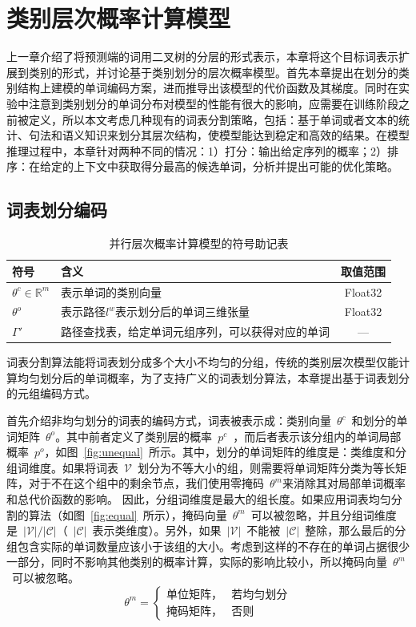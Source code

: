 \chapter{类别层次概率计算模型}
上一章介绍了将预测端的词用二叉树的分层的形式表示，本章将这个目标词表示扩展到类别的形式，并讨论基于类别划分的层次概率模型。首先本章提出在划分的类别结构上建模的单词编码方案，进而推导出该模型的代价函数及其梯度。同时在实验中注意到类别划分的单词分布对模型的性能有很大的影响，应需要在训练阶段之前被定义，所以本文考虑几种现有的词表分割策略，包括：基于单词或者文本的统计、句法和语义知识来划分其层次结构，使模型能达到稳定和高效的结果。在模型推理过程中，本章针对两种不同的情况：1）打分：输出给定序列的概率；2）排序：在给定的上下文中获取得分最高的候选单词，分析并提出可能的优化策略。


\section{词表划分编码}
\begin{table}[!ht]
  \centering
  \caption{并行层次概率计算模型的符号助记表}
\begin{tabular}{llc}
  \toprule
   符号&含义&取值范围\\ \midrule
$\theta^c\in\mathbb{R}^m$ &表示单词的类别向量& Float32\\
$ \theta^o$ &表示路径$l^w$表示划分后的单词三维张量&Float32 \\
$\Gamma'$ &路径查找表，给定单词元组序列，可以获得对应的单词&--- \\
  \bottomrule
\end{tabular}
\end{table}
词表分割算法能将词表划分成多个大小不均匀的分组，传统的类别层次模型仅能计算均匀划分后的单词概率，为了支持广义的词表划分算法，本章提出基于词表划分的元组编码方式。

首先介绍非均匀划分的词表的编码方式，词表被表示成：类别向量~$\theta^c$~和划分的单词矩阵~$\theta^o$。其中前者定义了类别层的概率~$p^c$~，而后者表示该分组内的单词局部概率~$p^o$，如图~\ref{fig:unequal}~所示。其中，划分的单词矩阵的维度是：类维度和分组词维度。如果将词表~$\mathcal{V}$~划分为不等大小的组，则需要将单词矩阵分类为等长矩阵，对于不在这个组中的剩余节点，我们使用零掩码~$\theta^m$来消除其对局部单词概率和总代价函数的影响。
因此，分组词维度是最大的组长度。如果应用词表均匀分割的算法（如图~\ref{fig:equal}~所示），掩码向量~$\theta^m$~可以被忽略，并且分组词维度是~$\mathcal{|V|/|C|}$（~$\mathcal{|C|}$~表示类维度）。另外，如果~$\mathcal{|V|}$~不能被~$\mathcal{|C|}$~整除，那么最后的分组包含实际的单词数量应该小于该组的大小。考虑到这样的不存在的单词占据很少一部分，同时不影响其他类别的概率计算，实际的影响比较小，所以掩码向量~$\theta^m$~可以被忽略。
\begin{equation}\label{equ:partition}
 \theta^m=
\begin{cases}
    \text{单位矩阵，}& \text{若均匀划分} \\
    \text{掩码矩阵，} & \text{否则}
\end{cases}
\end{equation}

